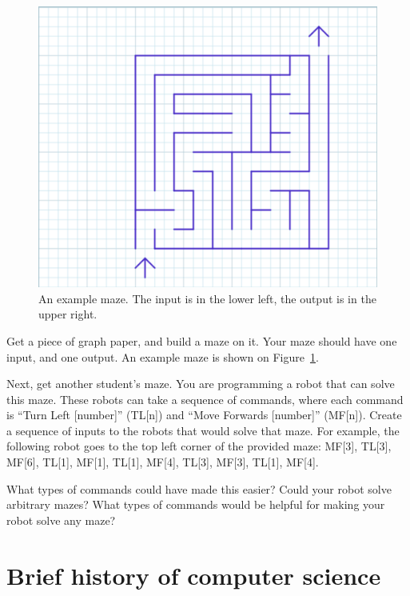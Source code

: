 \begin{figure}
  \centering
    \includegraphics[scale=.4]{graph-paper.png}
    \caption{An example maze. The input is in the lower left, the output is in
      the upper right.}
    \label{fig:graph-paper}
\end{figure}

\begin{exercise}
  Get a piece of graph paper, and build a maze on it. Your maze should have one
  input, and one output. An example maze is shown on
  Figure~\ref{fig:graph-paper}.

  Next, get another student's maze. You are programming a robot that can solve
  this maze. These robots can take a sequence of commands, where each command is
  ``Turn Left [number]'' (TL[n]) and ``Move Forwards [number]'' (MF[n]). Create a sequence of inputs to the robots
  that would solve that maze.  For example, the following robot goes to the top
  left corner of the provided maze: MF[3], TL[3], MF[6],
  TL[1], MF[1], TL[1], MF[4], TL[3], MF[3], TL[1], MF[4].

  What types of commands could have made this easier? Could your robot solve
  arbitrary mazes? What types of commands would be helpful for making your robot
  solve any maze?
\end{exercise}

\section{Brief history of computer science}

